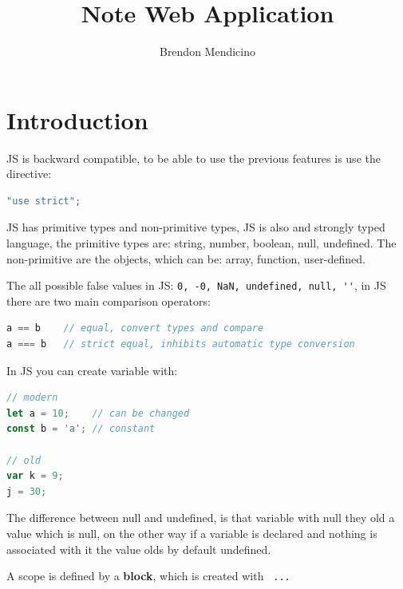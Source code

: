 \documentclass[12pt]{article}
\title{Note Web Application}
\author{Brendon Mendicino}
\begin{document}
\maketitle
\newpage
\tableofcontents
\newpage



\section{ Introduction}
JS is backward compatible, to be able to use the previous features is use the directive:
\begin{lstlisting}[language=js]
"use strict";
\end{lstlisting}
JS has primitive types and non-primitive types, JS is also and strongly typed language, the primitive types are: string, number, boolean, null, undefined. The non-primitive are the objects, which can be: array, function, user-defined.

The all possible false values in JS: \verb|0, -0, NaN, undefined, null, ''|, in JS there are two main comparison operators:
\begin{lstlisting}[language=js]
a == b    // equal, convert types and compare
a === b   // strict equal, inhibits automatic type conversion
\end{lstlisting}
In JS you can create variable with:
\begin{lstlisting}[language=js]
// modern
let a = 10;    // can be changed
const b = 'a'; // constant

// old
var k = 9;
j = 30;
\end{lstlisting}
The difference between null and undefined, is that variable with null they old a value which is null, on the other way if a variable is declared and nothing is associated with it the value olds by default undefined.

A scope is defined by a \textbf{block}, which is created with \texttt{{ ... }}
\end{document}
